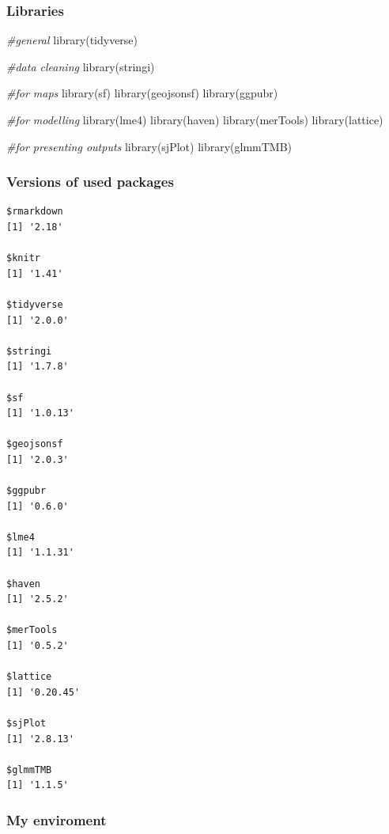 \documentclass[
]{article}
\newenvironment{Shaded}{\begin{snugshade}}{\end{snugshade}}
\newcommand{\CommentTok}[1]{\textcolor[rgb]{0.56,0.35,0.01}{\textit{#1}}}
\newcommand{\FunctionTok}[1]{\textcolor[rgb]{0.00,0.00,0.00}{#1}}
\newcommand{\NormalTok}[1]{#1}
\begin{document}
\hypertarget{libraries}{%
\subsubsection{Libraries}\label{libraries}}

\begin{Shaded}
\begin{Highlighting}[]
\CommentTok{\#general}
\FunctionTok{library}\NormalTok{(tidyverse)}

\CommentTok{\#data cleaning}
\FunctionTok{library}\NormalTok{(stringi)}

\CommentTok{\#for maps}
\FunctionTok{library}\NormalTok{(sf)}
\FunctionTok{library}\NormalTok{(geojsonsf)}
\FunctionTok{library}\NormalTok{(ggpubr)}

\CommentTok{\#for modelling}
\FunctionTok{library}\NormalTok{(lme4)}
\FunctionTok{library}\NormalTok{(haven)}
\FunctionTok{library}\NormalTok{(merTools)}
\FunctionTok{library}\NormalTok{(lattice)}

\CommentTok{\#for presenting outputs}
\FunctionTok{library}\NormalTok{(sjPlot)}
\FunctionTok{library}\NormalTok{(glmmTMB)}
\end{Highlighting}
\end{Shaded}

\hypertarget{versions-of-used-packages}{%
\subsubsection{Versions of used
packages}\label{versions-of-used-packages}}

\begin{verbatim}
$rmarkdown
[1] '2.18'

$knitr
[1] '1.41'

$tidyverse
[1] '2.0.0'

$stringi
[1] '1.7.8'

$sf
[1] '1.0.13'

$geojsonsf
[1] '2.0.3'

$ggpubr
[1] '0.6.0'

$lme4
[1] '1.1.31'

$haven
[1] '2.5.2'

$merTools
[1] '0.5.2'

$lattice
[1] '0.20.45'

$sjPlot
[1] '2.8.13'

$glmmTMB
[1] '1.1.5'
\end{verbatim}

\hypertarget{my-enviroment}{%
\subsubsection{My enviroment}\label{my-enviroment}}
\end{document}
